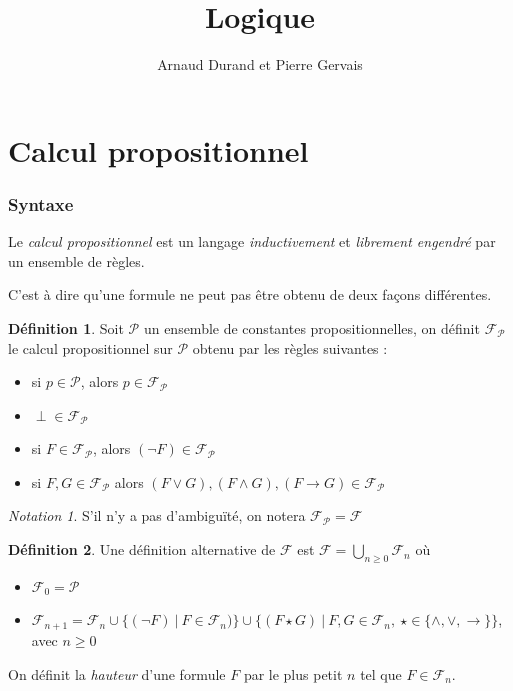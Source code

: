\documentclass[]{article}
\title{Logique}
\author{Arnaud Durand et Pierre Gervais}
\theoremstyle{remark}
\newtheorem{mynot}{Notation}
\theoremstyle{definition}
\newtheorem{mydef}{Définition}
\begin{document}
\maketitle

\tableofcontents

\part{Calcul propositionnel}

\section{Syntaxe}

Le \textit{calcul propositionnel} est un langage \textit{inductivement} et \textit{librement engendré} par un ensemble de règles.

C'est à dire qu'une formule ne peut pas être obtenu de deux façons différentes.

\begin{mydef}	
	Soit $\mathcal{P}$ un ensemble de constantes propositionnelles, on définit $\mathcal{F}_\mathcal{P}$ le calcul propositionnel sur $\mathcal{P}$ obtenu par les règles suivantes :
	\begin{itemize}
		\item si $p \in \mathcal{P}$, alors $p \in \mathcal{F}_\mathcal{P}$
		
		\item $\perp \in \mathcal{F}_\mathcal{P}$
		
		\item si $F \in \mathcal{F}_\mathcal{P}$, alors $\left(\neg F\right) \in \mathcal{F}_\mathcal{P}$
		
		\item si $F, G \in \mathcal{F}_\mathcal{P}$ alors $(F \lor G), (F \land G), (F \rightarrow G) \in \mathcal{F}_\mathcal{P}$
	\end{itemize}
\end{mydef}

\begin{mynot}
	S'il n'y a pas d'ambiguïté, on notera $\mathcal{F}_\mathcal{P} = \mathcal{F}$
\end{mynot}

\begin{mydef}
	Une définition alternative de $\mathcal{F}$ est $\displaystyle \mathcal{F} = \bigcup_{n \geqslant 0} \mathcal{F}_n$
	où
	\begin{itemize}
		\item $\mathcal{F}_0 = \mathcal{P}$
		\item $\mathcal{F}_{n+1} = \mathcal{F}_n \cup \{(\neg F) ~ | ~ F \in \mathcal{F}_n)\} \cup \{(F \star G) ~ | ~ F, G \in \mathcal{F}_n, ~ \star \in \{\land, \lor, \rightarrow\}\}$, avec $n \geqslant 0$
	\end{itemize}
	
	On définit la \textit{hauteur} d'une formule $F$ par le plus petit $n$ tel que $F \in \mathcal{F}_n$.
\end{mydef}
\end{document}
